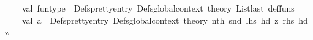 \begin{isabellebody}
\isanewline
\ \ \ \ val\ fun{\isacharunderscore}{\kern0pt}type\ {\isacharequal}{\kern0pt}\ Defs{\isachardot}{\kern0pt}pretty{\isacharunderscore}{\kern0pt}entry\ {\isacharparenleft}{\kern0pt}Defs{\isachardot}{\kern0pt}global{\isacharunderscore}{\kern0pt}context\ {\isacharat}{\kern0pt}{\isacharbraceleft}{\kern0pt}theory{\isacharbraceright}{\kern0pt}{\isacharparenright}{\kern0pt}\ {\isacharparenleft}{\kern0pt}List{\isachardot}{\kern0pt}last\ def{\isacharunderscore}{\kern0pt}funs{\isacharparenright}{\kern0pt}\isanewline
\isanewline
\ \ \ {\isacharparenleft}{\kern0pt}{\isacharasterisk}{\kern0pt}\ val\ a\ {\isacharequal}{\kern0pt}\ Defs{\isachardot}{\kern0pt}pretty{\isacharunderscore}{\kern0pt}entry\ {\isacharparenleft}{\kern0pt}Defs{\isachardot}{\kern0pt}global{\isacharunderscore}{\kern0pt}context\ {\isacharat}{\kern0pt}{\isacharbraceleft}{\kern0pt}theory{\isacharbraceright}{\kern0pt}{\isacharparenright}{\kern0pt}\ {\isacharparenleft}{\kern0pt}nth\ {\isacharparenleft}{\kern0pt}snd\ {\isacharparenleft}{\kern0pt}{\isacharhash}{\kern0pt}lhs\ {\isacharparenleft}{\kern0pt}hd\ z{\isacharparenright}{\kern0pt}{\isacharcomma}{\kern0pt}\ {\isacharhash}{\kern0pt}rhs\ {\isacharparenleft}{\kern0pt}hd\ z{\isacharparenright}{\kern0pt}{\isacharparenright}{\kern0pt}\ {\isacharparenright}{\kern0pt}{}{\isacharparenright}{\kern0pt}\ {\isacharasterisk}{\kern0pt}{\isacharparenright}{\kern0pt}\isanewline
\ {\isacartoucheclose}%
\endisatagML
{\isafoldML}%
%
\isadelimML
\isanewline
%
\endisadelimML
%
\isadelimtheory
\isanewline
%
\endisadelimtheory
%
\isatagtheory
{}\isamarkupfalse%
%
\endisatagtheory
{\isafoldtheory}%
%
\isadelimtheory
%
\endisadelimtheory
%
\end{isabellebody}%
\endinput
